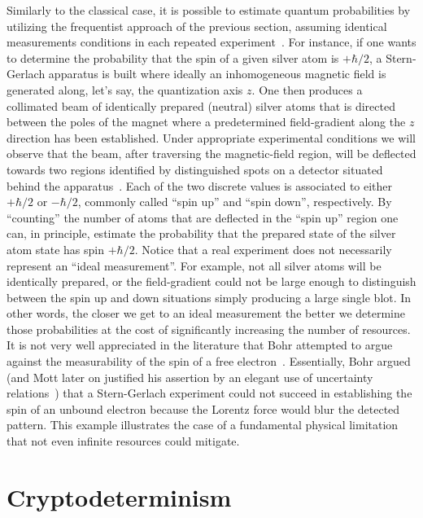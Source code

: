 \documentclass[12pt]{iopart}
\theoremstyle{plain}
\theoremstyle{definition}
\begin{document}
Similarly to the classical case, it is possible to estimate quantum
probabilities by utilizing the frequentist approach of the previous
section, assuming identical measurements conditions in each repeated
experiment~\cite{peres1995quantum}. For instance, if one wants to
determine the probability that the spin of a given silver atom is
$+\hbar/2$, a Stern-Gerlach apparatus is built where ideally an inhomogeneous
magnetic field is generated along, let's say, the quantization axis
$z$. One then produces a collimated beam of identically prepared
(neutral) silver atoms that is directed between the poles of the magnet
where a predetermined field-gradient along the $z$ direction has
been established. Under appropriate experimental conditions we will
observe that the beam, after traversing the magnetic-field region,
will be deflected towards two regions identified by distinguished
spots on a detector situated behind the apparatus~\cite{Stern1988,peres1995quantum,544199,Griffiths2003}.
Each of the two discrete values is associated to either $+\hbar/2$
or $-\hbar/2$, commonly called ``spin up'' and ``spin down'',
respectively. By ``counting'' the number of atoms that are deflected
in the ``spin up'' region one can, in principle, estimate the probability
that the prepared state of the silver atom state has spin $+\hbar/2$.
Notice that a real experiment does not necessarily represent an ``ideal
measurement''. For example, not all silver atoms will be identically
prepared, or the field-gradient could not be large enough to distinguish
between the spin up and down situations simply producing a large single
blot. In other words, the closer we get to an ideal measurement the
better we determine those probabilities at the cost of significantly
increasing the number of resources. It is not very well appreciated
in the literature that Bohr attempted to argue against the measurability
of the spin of a free electron~\cite{Bohr1985,MartensDeMuynck1994,McEvoy2001}.
Essentially, Bohr argued (and Mott later on justified his assertion
by an elegant use of uncertainty relations~\cite{10.2307/j.ctt7ztxn5.15})
that a Stern-Gerlach experiment could not succeed in establishing
the spin of an unbound electron because the Lorentz force would blur
the detected pattern. This example illustrates the case of a fundamental
physical limitation that not even infinite resources could mitigate.



\section{Cryptodeterminism}
\end{document}
